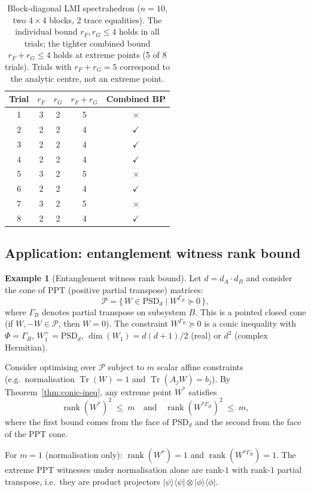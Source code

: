 \documentclass[11pt,a4paper]{article}
\theoremstyle{definition}
\newtheorem{example}[theorem]{Example}
\newcommand{\rank}{\operatorname{rank}}
\newcommand{\PSD}{\mathrm{PSD}}
\newcommand{\Tr}{\operatorname{Tr}}
\newcommand{\ket}[1]{|#1\rangle}
\newcommand{\bra}[1]{\langle#1|}
\begin{document}
\begin{table}[htbp]
\centering
\caption{Block-diagonal LMI spectrahedron ($n = 10$, two
$4 \times 4$ blocks, 2 trace equalities).  The individual bound
$r_F, r_G \leq 4$ holds in all trials; the tighter combined bound
$r_F + r_G \leq 4$ holds at extreme points (5 of 8 trials).
Trials with $r_F + r_G = 5$ correspond to the analytic centre,
not an extreme point.}
\label{tab:block-lmi}
\begin{tabular}{ccccc}
\toprule
\textbf{Trial} & $r_F$ & $r_G$ & $r_F + r_G$
  & \textbf{Combined BP} \\
\midrule
1 & 3 & 2 & 5 & $\times$ \\
2 & 2 & 2 & 4 & $\checkmark$ \\
3 & 2 & 2 & 4 & $\checkmark$ \\
4 & 2 & 2 & 4 & $\checkmark$ \\
5 & 3 & 2 & 5 & $\times$ \\
6 & 2 & 2 & 4 & $\checkmark$ \\
7 & 3 & 2 & 5 & $\times$ \\
8 & 2 & 2 & 4 & $\checkmark$ \\
\bottomrule
\end{tabular}
\end{table}

\subsection{Application: entanglement witness rank bound}

\begin{example}[Entanglement witness rank bound]
\label{ex:witness}
Let $d = d_A \cdot d_B$ and consider the cone of PPT
(positive partial transpose) matrices:
\[
  \mathcal{P} = \bigl\{\, W \in \PSD_d \;\big|\;
    W^{\Gamma_B} \succeq 0 \,\bigr\},
\]
where $\Gamma_B$ denotes partial transpose on subsystem $B$.
This is a pointed closed cone (if $W, -W \in \mathcal{P}$, then
$W = 0$).  The constraint $W^{\Gamma_B} \succeq 0$ is a conic
inequality with $\Phi = \Gamma_B$, $W_1^+ = \PSD_d$,
$\dim(W_1) = d(d+1)/2$ (real) or $d^2$ (complex Hermitian).

Consider optimising over $\mathcal{P}$ subject to $m$ scalar
affine constraints (e.g.\ normalisation $\Tr(W) = 1$ and
$\Tr(A_j W) = b_j$).  By Theorem~\ref{thm:conic-ineq}, any
extreme point $W^*$ satisfies
\[
  \rank(W^*)^2 \;\leq\; m \quad\text{and}\quad
  \rank(W^{*\Gamma_B})^2 \;\leq\; m,
\]
where the first bound comes from the face of $\PSD_d$ and the
second from the face of the PPT cone.

For $m = 1$ (normalisation only): $\rank(W^*) = 1$ and
$\rank(W^{*\Gamma_B}) = 1$.  The extreme PPT witnesses under
normalisation alone are rank-$1$ with rank-$1$ partial transpose,
i.e.\ they are product projectors $\ket{\psi}\bra{\psi} \otimes
\ket{\phi}\bra{\phi}$.
\end{example}
\end{document}
